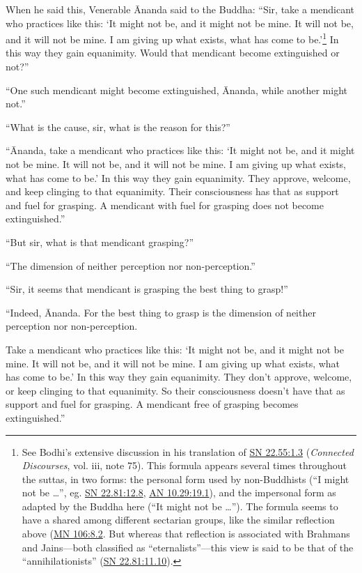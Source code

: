 \documentclass[12pt,openany]{book}%
\begin{document}
When he said this, Venerable Ānanda said to the Buddha: “Sir, take a mendicant who practices like this: ‘It might not be, and it might not be mine. It will not be, and it will not be mine. I am giving up what exists, what has come to be.’\footnote{See Bodhi’s extensive discussion in his translation of \href{https://suttacentral.net/sn22.55/en/sujato\#1.3}{SN 22.55:1.3} (\emph{Connected Discourses}, vol. iii, note 75). This formula appears several times throughout the suttas, in two forms: the personal form used by non-Buddhists  (“I might not be …”, eg. \href{https://suttacentral.net/sn22.81/en/sujato\#12.8}{SN 22.81:12.8}, \href{https://suttacentral.net/an10.29/en/sujato\#19.1}{AN 10.29:19.1}), and the impersonal form as adapted by the Buddha here (“It might not be …”). The formula seems to have a shared among different sectarian groups, like the similar reflection above (\href{https://suttacentral.net/mn106/en/sujato\#8.2}{MN 106:8.2}. But whereas that reflection is associated with Brahmans and Jains—both classified as “eternalists”—this view is said to be that of the “annihilationists” (\href{https://suttacentral.net/sn22.81/en/sujato\#11.10}{SN 22.81:11.10}). } In this way they gain equanimity. Would that mendicant become extinguished or not?” 

“One such mendicant might become extinguished, Ānanda, while another might not.” 

“What is the cause, sir, what is the reason for this?” 

“Ānanda, take a mendicant who practices like this: ‘It might not be, and it might not be mine. It will not be, and it will not be mine. I am giving up what exists, what has come to be.’ In this way they gain equanimity. They approve, welcome, and keep clinging to that equanimity. Their consciousness has that as support and fuel for grasping. A mendicant with fuel for grasping does not become extinguished.” 

“But sir, what is that mendicant grasping?” 

“The dimension of neither perception nor non-perception.” 

“Sir, it seems that mendicant is grasping the best thing to grasp!” 

“Indeed, Ānanda. For the best thing to grasp is the dimension of neither perception nor non-perception. 

Take a mendicant who practices like this: ‘It might not be, and it might not be mine. It will not be, and it will not be mine. I am giving up what exists, what has come to be.’ In this way they gain equanimity. They don’t approve, welcome, or keep clinging to that equanimity. So their consciousness doesn’t have that as support and fuel for grasping. A mendicant free of grasping becomes extinguished.” 
\end{document}
